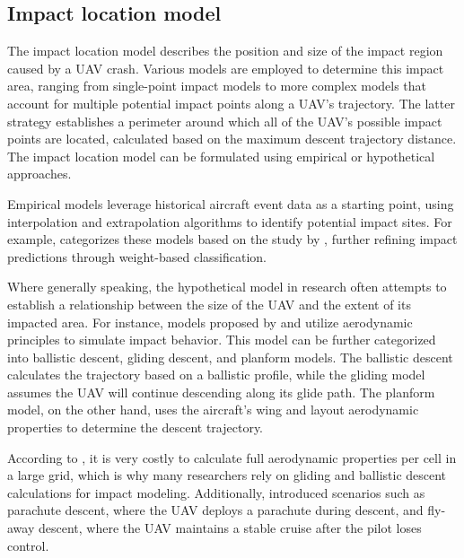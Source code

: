 \documentclass[12pt]{report}
\begin{document}
        \subsection{Impact location model}
            The impact location model describes the position and size of the impact region caused by a UAV crash.
            Various models are employed to determine this impact area, ranging from single-point impact models to more
            complex models that account for multiple potential impact points along a UAV's trajectory. The latter
            strategy establishes a perimeter around which all of the UAV's possible impact points are located,
            calculated based on the maximum descent trajectory distance. The impact location model can be formulated
            using empirical or hypothetical approaches.
                
            Empirical models leverage historical aircraft event data as a starting point, using interpolation and
            extrapolation algorithms to identify potential impact sites. For example, \cite{melnyk_third-party_2014}
            categorizes these models based on the study by \cite{ale_assessment_2000}, further refining impact
            predictions through weight-based classification.
                
            \pagebreak
            Where generally speaking, the hypothetical model in research often attempts to establish a relationship
            between the size of the UAV and the extent of its impacted area. For instance, models proposed by
            \cite{primatesta_ground_2020} and \cite{burke_system-level_2011} utilize aerodynamic principles to simulate
            impact behavior. This model can be further categorized into ballistic descent, gliding descent, and planform
            models. The ballistic descent calculates the trajectory based on a ballistic profile, while the gliding
            model assumes the UAV will continue descending along its glide path. The planform model, on the other hand,
            uses the aircraft's wing and layout aerodynamic properties to determine the descent trajectory.
                
            According to \cite{primatesta_risk-based_2020}, it is very costly to calculate full aerodynamic properties
            per cell in a large grid, which is why many researchers rely on gliding and ballistic descent calculations
            for impact modeling. Additionally, \cite{primatesta_ground_2020} introduced scenarios such as parachute
            descent, where the UAV deploys a parachute during descent, and fly-away descent, where the UAV maintains a
            stable cruise after the pilot loses control.
                
\end{document}
